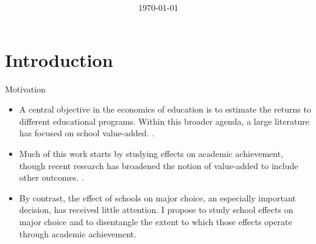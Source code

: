 \documentclass[notes,11pt, aspectratio=169]{beamer}
\title{\centering{ How much do high schools matter?: \\  Effects on college choice beyond achievement} \\ }
\author[BEAM (U ABC)]{%
  \texorpdfstring{%
    \begin{columns}
      \column{.3\linewidth}
      \centering
      \column{.3\linewidth}
      \centering
 Bruno E. Aravena-Magüida\\ UChicago  
      \column{.3\linewidth}
      \centering
    \end{columns}
 }
 {BEAM}
}
\date{\vspace{20}\hfill \today }  %
\newenvironment{wideitemize}{%
  \begin{minipage}{0.90\textwidth}
  \begin{itemize}
  \addtolength{\itemsep}{1em}
}{%
  \end{itemize}
  \end{minipage}
}
\let\oldparencite\parencite
\renewcommand{\parencite}[2][]{%
  \footnotesize {\tiny \oldparencite[#1]{#2}} \normalsize %
}
\begin{document}
\maketitle



\section{Introduction}




\begin{frame}{Motivation}
\begin{wideitemize}


\item A central objective in the economics of education is to estimate the returns to different educational programs. Within this broader agenda, a large literature has focused on school value-added. \parencite{angrist_stand_2016, dobbie_medium-term_2015, angrist_leveraging_2017, angrist_credible_2024}. 

\item Much of this work starts by studying effects on academic achievement, though recent research has broadened the notion of value-added to include other outcomes. \parencite[]{beuermann_what_2023, rose_effects_2022}. 

\item By contrast, the effect of schools on major choice, an especially important decision, has received little attention. I propose to study school effects on major choice and to disentangle the extent to which those effects operate through academic achievement.
\end{wideitemize}
\end{frame}
\end{document}
